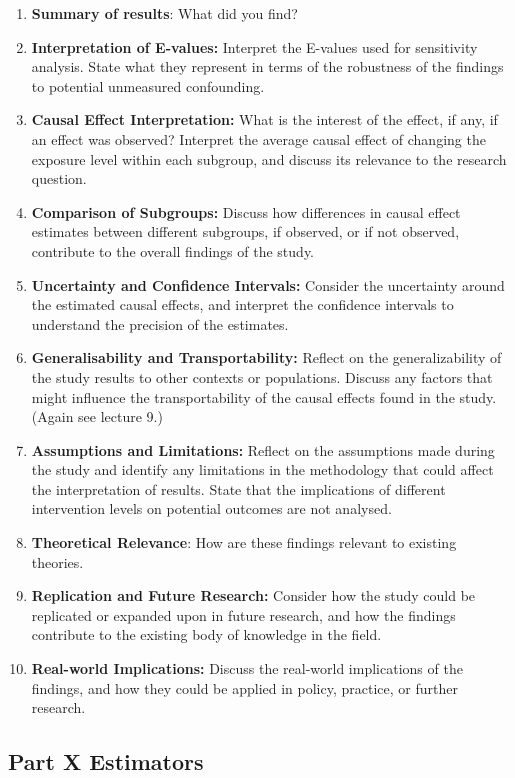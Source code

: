 \documentclass[
  singlecolumn]{article}
\begin{document}
\begin{enumerate}
\def\labelenumi{\arabic{enumi}.}
\item
  \textbf{Summary of results}: What did you find?
\item
  \textbf{Interpretation of E-values:} Interpret the E-values used for
  sensitivity analysis. State what they represent in terms of the
  robustness of the findings to potential unmeasured confounding.
\item
  \textbf{Causal Effect Interpretation:} What is the interest of the
  effect, if any, if an effect was observed? Interpret the average
  causal effect of changing the exposure level within each subgroup, and
  discuss its relevance to the research question.
\item
  \textbf{Comparison of Subgroups:} Discuss how differences in causal
  effect estimates between different subgroups, if observed, or if not
  observed, contribute to the overall findings of the study.
\item
  \textbf{Uncertainty and Confidence Intervals:} Consider the
  uncertainty around the estimated causal effects, and interpret the
  confidence intervals to understand the precision of the estimates.
\item
  \textbf{Generalisability and Transportability:} Reflect on the
  generalizability of the study results to other contexts or
  populations. Discuss any factors that might influence the
  transportability of the causal effects found in the study. (Again see
  lecture 9.)
\item
  \textbf{Assumptions and Limitations:} Reflect on the assumptions made
  during the study and identify any limitations in the methodology that
  could affect the interpretation of results. State that the
  implications of different intervention levels on potential outcomes
  are not analysed.
\item
  \textbf{Theoretical Relevance}: How are these findings relevant to
  existing theories.
\item
  \textbf{Replication and Future Research:} Consider how the study could
  be replicated or expanded upon in future research, and how the
  findings contribute to the existing body of knowledge in the field.
\item
  \textbf{Real-world Implications:} Discuss the real-world implications
  of the findings, and how they could be applied in policy, practice, or
  further research.
\end{enumerate}

\hypertarget{part-x-estimators}{%
\subsection{Part X Estimators}\label{part-x-estimators}}
\end{document}

